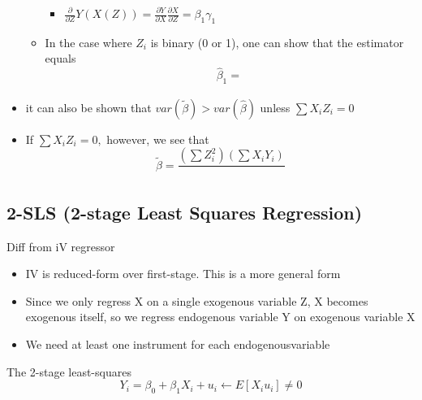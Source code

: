 \documentclass[10pt, oneside]{article}
\begin{document}
\begin{itemize}
\begin{itemize}
\begin{itemize}
            \item $\frac{\partial}{\partial Z} Y(X(Z)) = \frac{\partial Y}{\partial X} \frac{\partial X}{\partial Z} = \beta_1 \gamma_1$
        \end{itemize}
        \item In the case where $Z_i$ is binary (0 or 1), one can show that the estimator equals \[\hat \beta_1 = \frac{}{}\]
    \end{itemize}
    \item it can also be shown that $var(\tilde \beta) > var(\hat \beta)$ unless $\sum X_i Z_i = 0$
    \item If $\sum X_i Z_i = 0,$ however, we see that\[\tilde \beta = \frac{(\sum Z_i^2 ) (\sum X_i Y_i)}{}\]
\end{itemize}
\subsection{2-SLS (2-stage Least Squares Regression)}
Diff from iV regressor
\begin{itemize}
    \item IV is reduced-form over first-stage. This is a more general form
    \item Since we only regress X on a single exogenous variable Z, X becomes exogenous itself, so we regress endogenous variable Y on exogenous variable X
    \item We need at least one instrument for each endogenousvariable
\end{itemize}
The 2-stage least-squares
\[Y_i = \beta_0 + \beta_1 X_i + u_i \leftarrow E[X_i u_i] \neq 0\]
\end{document}
